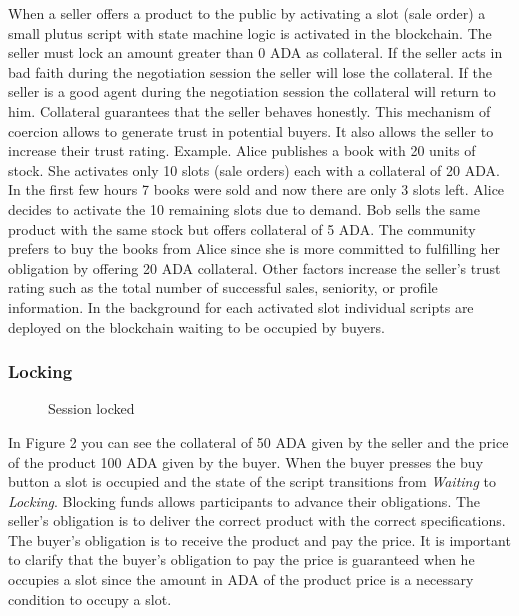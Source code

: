 \documentclass[12pt]{article}
\begin{document}
When a seller offers a product to the public by activating a slot (sale order) a small plutus script with state machine logic is activated in the blockchain.
The seller must lock an amount greater than 0 ADA as collateral. 
If the seller acts in bad faith during the negotiation session the seller will lose the collateral.
If the seller is a good agent during the negotiation session the collateral will return to him.
Collateral guarantees that the seller behaves honestly.
This mechanism of coercion allows to generate trust in potential buyers. 
It also allows the seller to increase their trust rating. Example. Alice publishes a book with 20 units of stock.
She activates only 10 slots (sale orders) each with a collateral of 20 ADA.
In the first few hours 7 books were sold and now there are only 3 slots left.
Alice decides to activate the 10 remaining slots due to demand.
Bob sells the same product with the same stock but offers collateral of 5 ADA. The community prefers to buy the books from Alice since she is more committed to fulfilling her obligation by offering 20 ADA collateral.
Other factors increase the seller's trust rating such as the total number of successful sales, seniority, or profile information.
In the background for each activated slot individual scripts are deployed on the blockchain waiting to be occupied by buyers.

\subsubsection { Locking }

\begin{figure}[ht]
  \centering
  
  \caption{Session locked}
  \label{fig:locking}
\end{figure}


In Figure 2 you can see the collateral of 50 ADA given by the seller and the price of the product 100 ADA given by the buyer.
When the buyer presses the buy button a slot is occupied and the state of the script transitions from \emph{Waiting} to \emph{Locking}.
Blocking funds allows participants to advance their obligations.
The seller's obligation is to deliver the correct product with the correct specifications. The buyer's obligation is to receive the product and pay the price.
It is important to clarify that the buyer's obligation to pay the price is guaranteed when he occupies a slot since the amount in ADA of the product price is a necessary condition to occupy a slot.
\end{document}
